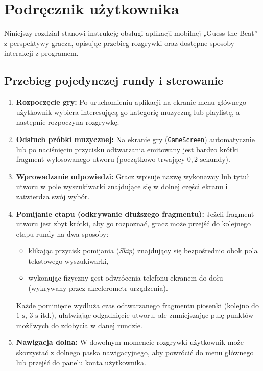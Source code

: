 \newpage
\section{Podręcznik użytkownika}  %

\hspace{0.60cm}Niniejszy rozdział stanowi instrukcję obsługi aplikacji mobilnej „Guess the Beat” z perspektywy gracza, opisując przebieg rozgrywki oraz dostępne sposoby interakcji z programem.

\subsection{Przebieg pojedynczej rundy i sterowanie}

\begin{enumerate}
    \item \textbf{Rozpoczęcie gry:} Po uruchomieniu aplikacji na ekranie menu głównego użytkownik wybiera interesującą go kategorię muzyczną lub playlistę, a następnie rozpoczyna rozgrywkę.
    \item \textbf{Odsłuch próbki muzycznej:} Na ekranie gry (\texttt{GameScreen}) automatycznie lub po naciśnięciu przycisku odtwarzania emitowany jest bardzo krótki fragment wylosowanego utworu (początkowo trwający $0,2\text{ sekundy}$).
    \item \textbf{Wprowadzanie odpowiedzi:} Gracz wpisuje nazwę wykonawcy lub tytuł utworu w pole wyszukiwarki znajdujące się w dolnej części ekranu i zatwierdza swój wybór.
    \item \textbf{Pomijanie etapu (odkrywanie dłuższego fragmentu):} Jeżeli fragment utworu jest zbyt krótki, aby go rozpoznać, gracz może przejść do kolejnego etapu rundy na dwa sposoby:
    \begin{itemize}
        \item klikając przycisk pomijania (\textit{Skip}) znajdujący się bezpośrednio obok pola tekstowego wyszukiwarki,
        \item wykonując fizyczny gest odwrócenia telefonu ekranem do dołu (wykrywany przez akcelerometr urządzenia).
    \end{itemize}
    Każde pominięcie wydłuża czas odtwarzanego fragmentu piosenki (kolejno do $1\text{ s}$, $3\text{ s}$ itd.), ułatwiając odgadnięcie utworu, ale zmniejszając pulę punktów możliwych do zdobycia w danej rundzie.
    \item \textbf{Nawigacja dolna:} W dowolnym momencie rozgrywki użytkownik może skorzystać z dolnego paska nawigacyjnego, aby powrócić do menu głównego lub przejść do panelu konta użytkownika.
\end{enumerate}